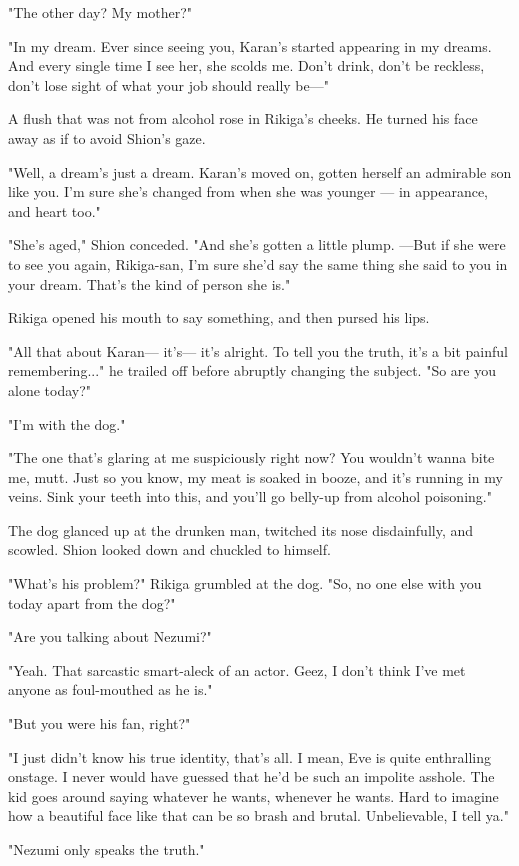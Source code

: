 "The other day? My mother?"

"In my dream. Ever since seeing you, Karan's started appearing in my
dreams. And every single time I see her, she scolds me. Don't drink,
don't be reckless, don't lose sight of what your job should really be---"

A flush that was not from alcohol rose in Rikiga's cheeks. He turned his
face away as if to avoid Shion's gaze.

"Well, a dream's just a dream. Karan's moved on, gotten herself an
admirable son like you. I'm sure she's changed from when she was younger
--- in appearance, and heart too."

"She's aged," Shion conceded. "And she's gotten a little plump. ---But if
she were to see you again, Rikiga-san, I'm sure she'd say the same thing
she said to you in your dream. That's the kind of person she is."

Rikiga opened his mouth to say something, and then pursed his lips.

"All that about Karan--- it's--- it's alright. To tell you the truth, it's a
bit painful remembering..." he trailed off before abruptly changing the
subject. "So are you alone today?"

"I'm with the dog."

"The one that's glaring at me suspiciously right now? You wouldn't wanna
bite me, mutt. Just so you know, my meat is soaked in booze, and it's
running in my veins. Sink your teeth into this, and you'll go belly-up
from alcohol poisoning."

The dog glanced up at the drunken man, twitched its nose disdainfully,
and scowled. Shion looked down and chuckled to himself.

"What's his problem?" Rikiga grumbled at the dog. "So, no one else with
you today apart from the dog?"

"Are you talking about Nezumi?"

"Yeah. That sarcastic smart-aleck of an actor. Geez, I don't think I've
met anyone as foul-mouthed as he is."

"But you were his fan, right?"

"I just didn't know his true identity, that's all. I mean, Eve is quite
enthralling onstage. I never would have guessed that he'd be such an
impolite asshole. The kid goes around saying whatever he wants, whenever
he wants. Hard to imagine how a beautiful face like that can be so brash
and brutal. Unbelievable, I tell ya."

"Nezumi only speaks the truth."

